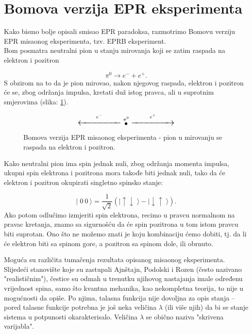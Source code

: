 \section{Bomova verzija EPR eksperimenta}

Kako bismo bolje opisali smisao EPR paradoksa, razmotrimo Bomovu verziju EPR misaonog eksperimenta, tzv. EPRB eksperiment.\\
Bom posmatra neutralni pion u stanju mirovanja koji se zatim raspada na elektron i pozitron

\begin{equation}
  \pi^0 \rightarrow e^- + e^+.
\end{equation}
S obzirom na to da je pion mirovao, nakon njegovog raspada, elektron i pozitron će se, zbog odr\v zanja impulsa, kretati du\v z istog pravca, ali u suprotnim smjerovima (slika: \ref{fig:pion_decay}).

\begin{figure}[H]
  \[
    \Large{
      \overset{e^-}{\xleftarrow{\hspace{2cm}}}
      \overset{\pi^0}{\bullet}
      \overset{e^+}{\xrightarrow{\hspace{2cm}}}
    }
  \]
  \caption{Bomova verzija EPR misaonog eksperimenta - pion u mirovanju se raspada na elektron i pozitron.}
  \label{fig:pion_decay}
\end{figure}


Kako neutralni pion ima spin jednak nuli, zbog održanja momenta impulsa, ukupni spin elektrona i pozitrona mora takođe biti jednak nuli,
tako da će elektron i pozitron okupirati singletno spinsko stanje:

\begin{equation}
  | \;\! 0 \:\! 0 \:\! \rangle = \frac{1}{\sqrt2}(| \! \uparrow\downarrow \;\! \rangle - | \! \downarrow\uparrow \;\! \rangle). \label{eq:singlet_state}
\end{equation}
Ako potom odlučimo izmjeriti spin elektrona, recimo u pravcu normalnom na pravac kretanja, znamo sa sigurnošću da će spin pozitrona u tom istom pravcu biti suprotan.
Ono što ne možemo znati je koju kombinaciju ćemo dobiti, tj. da li će elektron biti sa spinom gore, a pozitron sa spinom dole, ili obrnuto.

Moguća su različita tumačenja rezultata opisanog misaonog eksperimenta.
Slijedeći stanovište koje su zastupali Ajnštajn, Podolski i Rozen (često nazivano "realističnim"), čestice su odmah u trenutku njihovog nastajanja imale određenu vrijednost spina, samo što kvantna mehanika, kao nekompletna teorija, to nije u mogućnosti da opiše.
Po njima, talasna funkcija nije dovoljna za opis stanja – pored talasne funkcije potrebna je još neka veličina $\lambda$ (ili više njih) da bi se stanje sistema u potpunosti okarakterisalo. Veličina $\lambda$ se obično naziva "skrivena varijabla".

